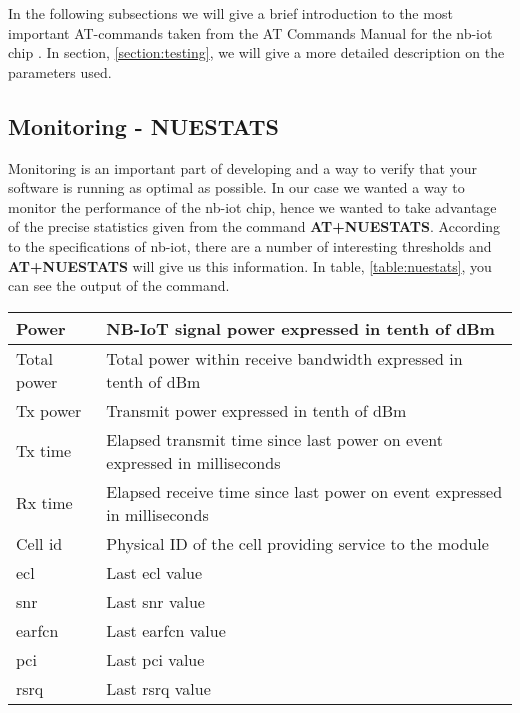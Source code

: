 \documentclass[USenglish]{ifimaster}  %
\begin{document}
In the following subsections we will give a brief introduction to the most important AT-commands taken from the AT Commands Manual for the \acrshort{nb-iot} chip \cite{atcommand:ubloxchip}. In section, \vref{section:testing}, we will give a more detailed description on the parameters used.

\subsection{Monitoring - NUESTATS}
Monitoring is an important part of developing and a way to verify that your software is running as optimal as possible. In our case we wanted a way to monitor the performance of the \acrshort{nb-iot} chip, hence we wanted to take advantage of the precise statistics given from the command \textbf{AT+NUESTATS}. According to the specifications of \acrshort{nb-iot}, there are a number of interesting thresholds and \textbf{AT+NUESTATS} will give us this information. In table, \vref{table:nuestats}, you can see the output of the command.

\begin{center} \label{table:nuestats}
  \begin{tabular}{ | l | m{10cm} | }
    \hline
    Power & NB-IoT signal power expressed in tenth of dBm \\
    \hline
    Total power & Total power within receive bandwidth expressed in tenth of dBm \\
    \hline
    Tx power & Transmit power expressed in tenth of dBm \\
    \hline
    Tx time & Elapsed transmit time since last power on event expressed in milliseconds \\
    \hline
    Rx time & Elapsed receive time since last power on event expressed in milliseconds \\
    \hline
    Cell id & Physical ID of the cell providing service to the module \\
    \hline
    \acrshort{ecl} & Last \acrshort{ecl} value \\
    \hline
    \acrshort{snr} & Last \acrfull{snr} value \\
    \hline
    \acrshort{earfcn} & Last \acrfull{earfcn} value \\
    \hline
    \acrshort{pci} & Last \acrfull{pci} value \\
    \hline
    \acrshort{rsrq} & Last \acrfull{rsrq} value \\
    \hline
  \end{tabular}
\end{center}
\end{document}

